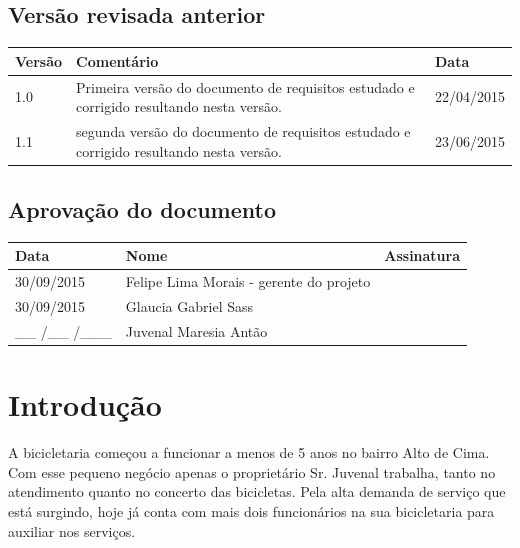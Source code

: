 \documentclass[
	12pt,				%
	openright,
	oneside,			%
	a4paper,			%
	chapter=TITLE,		%
	brazil				%
	]{abntex2}
\begin{document}
\section*{Versão revisada anterior}
\begin{flushleft}
	\begin{tabular}{| p{3cm} | p{9cm} | p{3cm} |}
 	   \hline
	    \textbf{Versão} 		& \textbf{Comentário} 				& \textbf{Data}  \\ \hline
	    1.0		 				& Primeira versão do documento de %
	    						requisitos estudado e corrigido %
	    						resultando nesta versão. 			& 22/04/2015 		 \\ \hline 	 
		1.1		 				& segunda versão do documento de %
	    						requisitos estudado e corrigido %
	    						resultando nesta versão. 			& 23/06/2015 		 \\ \hline 	   
	\end{tabular}
\end{flushleft}


\section*{Aprovação do documento}
\begin{flushleft}
	\begin{tabular}{| p{3cm} | p{7cm} | p{5cm} |}
 	   \hline
	    \textbf{Data} 		& \textbf{Nome} 										& \textbf{Assinatura}  \\ \hline
	    30/09/2015	 			& Felipe Lima Morais - gerente do projeto 			& 		 		 		\\ \hline
	    30/09/2015	 			& Glaucia Gabriel Sass					 			&  				 		\\ \hline
	    \_\_ /\_\_ /\_\_\_	 	& Juvenal Maresia Antão 							&  		 				\\ \hline
	\end{tabular}
\end{flushleft}

\newpage
\chapter{Introdução}

A bicicletaria começou a funcionar a menos de 5 anos no bairro Alto de Cima. Com esse pequeno negócio apenas o proprietário Sr. Juvenal trabalha, tanto no atendimento quanto no concerto das bicicletas. Pela alta demanda de serviço que está surgindo, hoje já conta com mais dois funcionários na sua bicicletaria para auxiliar nos serviços.
\end{document}
